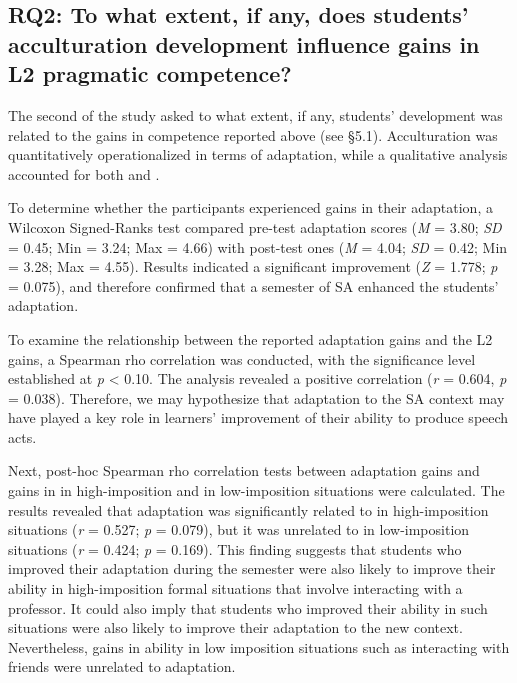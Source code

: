 \documentclass[output=paper]{langsci/langscibook}
\begin{document}
\subsection{RQ2: To what extent, if any, does students’ acculturation development influence gains in L2 pragmatic competence?}
\largerpage

The second  of the study asked to what extent, if any, students’  development was related to the gains in  competence reported above (see §5.1). Acculturation was quantitatively operationalized in terms of  adaptation, while a qualitative analysis accounted for both  and . 

To determine whether the participants experienced gains in their  adaptation, a Wilcoxon Signed-Ranks test compared pre-test adaptation scores (\textit{M} = 3.80; \textit{SD} = 0.45; Min = 3.24; Max = 4.66) with post-test ones (\textit{M} = 4.04; \textit{SD} = 0.42; Min = 3.28; Max = 4.55). Results indicated a significant improvement (\textit{Z} = 1.778; \textit{p} = 0.075), and therefore confirmed that a semester of SA enhanced the students’  adaptation. 

  
To examine the relationship between the reported  adaptation gains and the L2  gains, a Spearman rho correlation was conducted, with the significance level established at \textit{p} < 0.10. The analysis revealed a positive correlation (\textit{r} = 0.604, \textit{p} = 0.038). Therefore, we may hypothesize that adaptation to the SA context may have played a key role in learners’ improvement of their ability to produce speech acts. 

Next, post-hoc Spearman rho correlation tests between adaptation gains and gains in  in high-imposition and in low-imposition situations were calculated. The results revealed that  adaptation was significantly related to  in high-imposition situations (\textit{r} = 0.527; \textit{p} = 0.079), but it was unrelated to  in low-imposition situations (\textit{r} = 0.424; \textit{p} = 0.169). This finding suggests that students who improved their  adaptation during the semester were also likely to improve their  ability in high-imposition formal situations that involve interacting with a professor. It could also imply that students who improved their  ability in such situations were also likely to improve their adaptation to the new context. Nevertheless, gains in  ability in low imposition situations such as interacting with friends were unrelated to  adaptation. 
\end{document}
